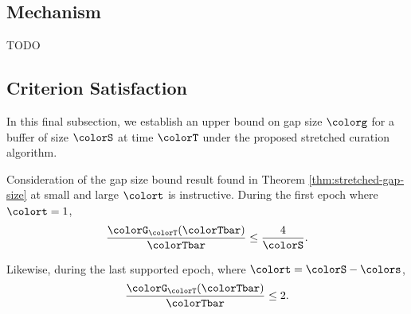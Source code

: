 \subsection{Mechanism}



TODO

\subsection{Criterion Satisfaction}

In this final subsection, we establish an upper bound on gap size $\colorg$ for a buffer of size $\colorS$ at time $\colorT$ under the proposed stretched curation algorithm.





Consideration of the gap size bound result found in Theorem \ref{thm:stretched-gap-size} at small and large $\colort$ is instructive.
During the first epoch where $\colort = 1$,
\begin{align*}
\frac{\colorG_{\colorT}(\colorTbar)}{\colorTbar}
\leq
\frac{4}{\colorS}.
\end{align*}

Likewise, during the last supported epoch, where $\colort = \colorS - \colors$,
\begin{align*}
\frac{\colorG_{\colorT}(\colorTbar)}{\colorTbar}
\leq
2.
\end{align*}

